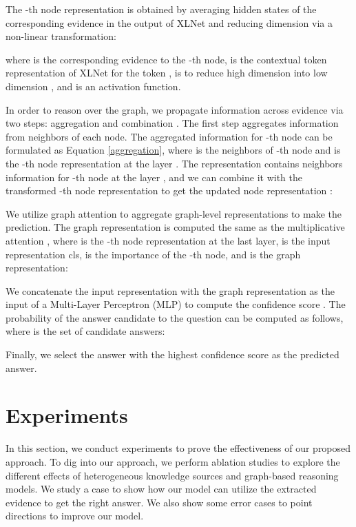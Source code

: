 \documentclass[letterpaper]{article} \usepackage{aaai20}  \usepackage{times}  \usepackage{helvet} \usepackage{courier}  \usepackage[hyphens]{url}  \usepackage{graphicx} \urlstyle{rm} \def\UrlFont{\rm}  \usepackage{graphicx}  \frenchspacing  \setlength{\pdfpagewidth}{8.5in}  \setlength{\pdfpageheight}{11in}
\begin{document}
The -th node representation  is obtained by averaging hidden states of the corresponding evidence in the output of XLNet and reducing dimension via a non-linear transformation: 
 
where  is the corresponding evidence to the -th node,  is the contextual token representation of XLNet for the token ,  is to reduce high dimension  into low dimension , and  is an activation function.  

In order to reason over the graph, we propagate information across evidence via two steps: aggregation and combination \cite{hamilton2017inductive}. The first step aggregates information from neighbors of each node. The aggregated information  for -th node can be formulated as Equation \ref{aggregation}, where  is the neighbors of -th node and  is the -th node representation at the layer . The representation  contains neighbors information for -th node at the layer , and we can combine it with the transformed -th node representation to get the updated node representation :
 
 

We utilize graph attention to aggregate graph-level representations to make the prediction.  The graph representation is computed the same as the multiplicative attention \cite{luong2015effective}, where  is the -th node representation at the last layer,  is the input representation cls,  is the importance of the -th node, and  is the graph representation: 



We concatenate the input representation  with the graph representation  as the input of a Multi-Layer Perceptron (MLP) to compute the confidence score . The probability of the answer candidate  to the question  can be computed as follows, where  is the set of candidate answers: 



Finally, we select the answer with the highest confidence score as the predicted answer.

\section{Experiments}
In this section, we conduct experiments to prove the effectiveness of our proposed approach. 
To dig into our approach, we perform ablation studies to explore the different effects of heterogeneous knowledge sources and graph-based reasoning models.
We study a case to show how our model can utilize the extracted evidence to get the right answer.
We also show some error cases to point directions to improve our model.
\end{document}
